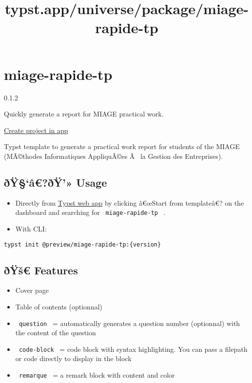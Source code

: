 \title{typst.app/universe/package/miage-rapide-tp}

\label{banner}
\label{template-thumbnail}

\section{miage-rapide-tp}\label{miage-rapide-tp}

{ 0.1.2 }

Quickly generate a report for MIAGE practical work.

\href{/app?template=miage-rapide-tp&version=0.1.2}{Create project in
app}

\label{readme}
Typst template to generate a practical work report for students of the
MIAGE (MÃ©thodes Informatiques AppliquÃ©es Ã~ la Gestion des
Entreprises).

\subsection{ðŸ§`â€?ðŸ'» Usage}\label{uxf0uxffuxe2uxf0uxff-usage}

\begin{itemize}
\item
  Directly from \href{https://typst.app/}{Typst web app} by clicking
  â€œStart from templateâ€? on the dashboard and searching for
  \texttt{\ miage-rapide-tp\ } .
\item
  With CLI:
\end{itemize}

\begin{verbatim}
typst init @preview/miage-rapide-tp:{version}
\end{verbatim}

\subsection{ðŸš€ Features}\label{uxf0uxffux161-features}

\begin{itemize}
\tightlist
\item
  Cover page
\item
  Table of contents (optionnal)
\item
  \texttt{\ question\ } = automatically generates a question number
  (optionnal) with the content of the question
\item
  \texttt{\ code-block\ } = code block with syntax highlighting. You can
  pass a filepath or code directly to display in the block
\item
  \texttt{\ remarque\ } = a remark block with content and color
\end{itemize}

